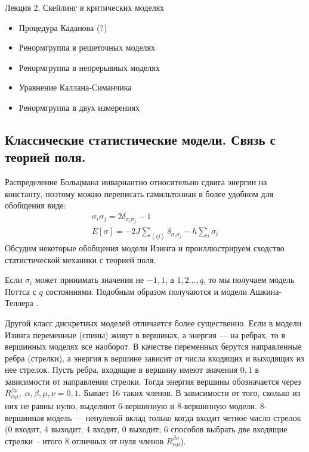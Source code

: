 \documentclass[a4paper,12pt]{article}
\theoremstyle{definition}
\theoremstyle{definition}
\theoremstyle{definition}
\begin{document}
 Лекция 2. Скейлинг в критических моделях
  \begin{itemize}
  \item Процедура Каданова (?)
  \item Ренормгруппа в решеточных моделях
  \item Ренормгруппа в непрерывных моделях
  \item Уравнение Каллана-Симанчика
  \item Ренормгруппа в двух измерениях
  \end{itemize}

\subsection{Классические статистические модели. Связь с теорией поля.}
\label{sec:statistical-models-qft}

Распределение Больцмана инвариантно относительно сдвига энергии на константу, поэтому можно
переписать гамильтониан в более удобном для обобщения виде:
\begin{equation}
  \label{eq:12}
  \begin{array}{l}
    \sigma_i\sigma_j=2\delta_{\sigma_i\sigma_j}-1\\
    E[\sigma]=-2J\sum_{\left<ij\right>}\delta_{\sigma_i\sigma_j}-h\sum_i \sigma_i
  \end{array}
\end{equation}
Обсудим некоторые обобщения модели Изинга и проиллюстрируем сходство статистической механики с теорией поля.

Если $\sigma_i$ может принимать значения не $-1,1$, а $1,2\dots,q$, то мы получаем модель Поттса с $q$ состояниями.
Подобным образом получаются и модели Ашкина-Теллера \cite{difrancesco1997cft}.

Другой класс дискретных моделей отличается более существенно. Если в модели Изинга переменные
(спины) живут в вершинах, а энергия --- на ребрах, то в вершинных моделях все наоборот. В качестве
переменных берутся направленные ребра (стрелки), а энергия в вершине зависит от числа входящих и
выходящих из нее стрелок. Пусть ребра, входящие в вершину имеют значения $0,1$ в зависимости от
направления стрелки. Тогда энергия вершины обозначается через $R_{\alpha\mu}^{\beta\nu},\;
\alpha,\beta,\mu,\nu=0,1$. Бывает 16 таких членов. В зависимости от того, сколько из них не равны
нулю, выделяют 6-вершинную и 8-вершинную модели. 8-вершинная модель --- ненулевой вклад только когда
входит четное число стрелок (0 входит, 4 выходит; 4 входит, 0 выходит; 6 способов выбрать две
входящие стрелки -- итого 8 отличных от нуля членов $R_{\alpha\mu}^{\beta\nu}$).
\end{document}
